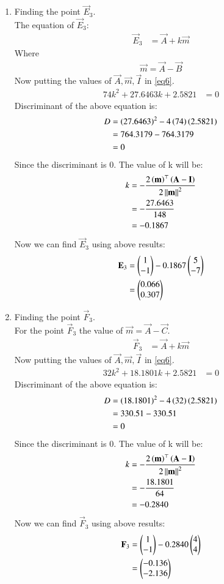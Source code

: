 \documentclass[journal,12pt,twocolumn]{IEEEtran}
\theoremstyle{remark}
\begin{document}
\begin{enumerate}
\item Finding the point $\vec{E}_3$.\\
The equation of $\vec{E}_3$:
\begin{align}
\vec{E}_3 &=\vec{A}+k\vec{m}
\end{align}
Where 
\begin{align}
\vec{m} = \vec{A}-\vec{B}
\end{align}
Now putting the values of $\vec{A}, \vec{m}, \vec{I}$ in \eqref{eq6}.
\begin{align}
74k^2+27.6463k+2.5821 &= 0
\end{align}
Discriminant of the above equation is:
\begin{align}
D &= \left(27.6463\right)^2-4\left(74\right)\left(2.5821\right)\\
&= 764.3179-764.3179\\
&= 0
\end{align}
Since the discriminant is $0$. The value of k will be:
\begin{align}
k &= -\frac{2\left(\mathbf{m}\right)^\top\left(\mathbf{A-I}\right)}{2\left\lVert\mathbf{m}\right\rVert^2} \\
&= -\frac{27.6463}{148} \\
&= -0.1867
\end{align}
Now we can find $\vec{E}_3$ using above results:
\begin{align}
\mathbf{E}_3 &=\begin{pmatrix}1\\-1\end{pmatrix}-0.1867\begin{pmatrix}5\\-7\end{pmatrix} \\
&=\begin{pmatrix}0.066\\0.307\end{pmatrix}
\end{align}
\item Finding the point $\vec{F}_3$.\\
For the point $\vec{F}_3$ the value of $\vec{m} = \vec{A}-\vec{C}$. 
\begin{align}
\vec{F}_3 &=\vec{A}+k\vec{m}
\end{align}
Now putting the values of $\vec{A}, \vec{m}, \vec{I}$ in \eqref{eq6}.
\begin{align}
32k^2+18.1801k+2.5821 &= 0
\end{align}
Discriminant of the above equation is:
\begin{align}
D &= \left(18.1801\right)^2-4\left(32\right)\left(2.5821\right)\\
&= 330.51-330.51\\
&= 0
\end{align}
Since the discriminant is $0$. The value of k will be:
\begin{align}
k &= -\frac{2\left(\mathbf{m}\right)^\top\left(\mathbf{A-I}\right)}{2\left\lVert\mathbf{m}\right\rVert^2}\\
&= -\frac{18.1801}{64}\\
&= -0.2840
\end{align}
Now we can find $\vec{F}_3$ using above results:
\begin{align}
\mathbf{F}_3 &=\begin{pmatrix}1\\-1\end{pmatrix}-0.2840\begin{pmatrix}4\\4\end{pmatrix}\\
&= \begin{pmatrix}-0.136\\-2.136\end{pmatrix}
\end{align}
\end{enumerate}
\end{document}

